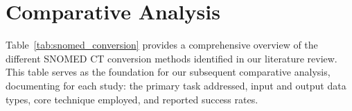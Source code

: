 \section{Comparative Analysis}

Table~\ref{tab:snomed_conversion} provides a comprehensive overview of the different SNOMED CT conversion methods identified in our literature review. This table serves as the foundation for our subsequent comparative analysis, documenting for each study: the primary task addressed, input and output data types, core technique employed, and reported success rates.


\setlength{\LTleft}{\fill}
\setlength{\LTright}{\fill}
\setlength{\tabcolsep}{1.5pt}
\scriptsize
